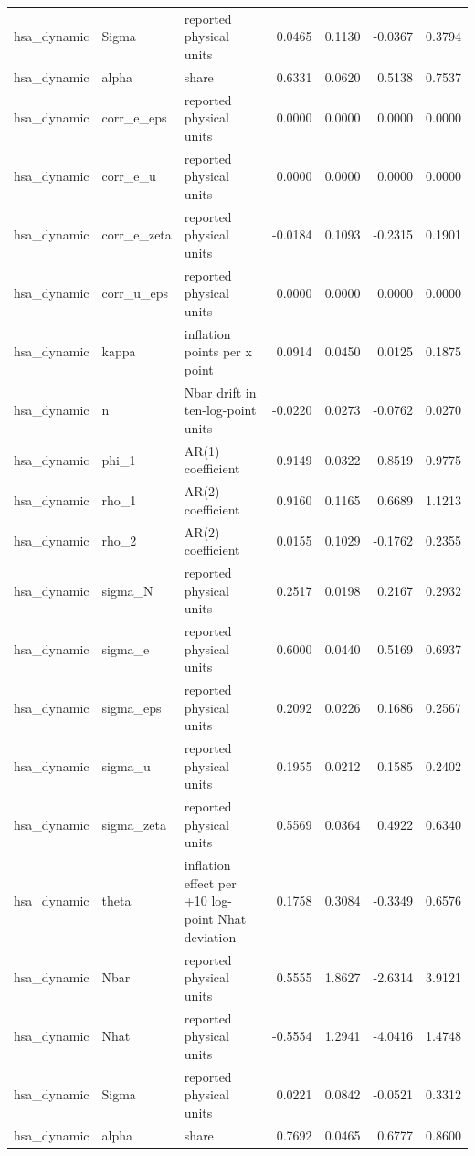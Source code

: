 \begin{tabular}{lllrrrr}
hsa\_dynamic & Sigma & reported physical units & 0.0465 & 0.1130 & -0.0367 & 0.3794 \\
hsa\_dynamic & alpha & share & 0.6331 & 0.0620 & 0.5138 & 0.7537 \\
hsa\_dynamic & corr\_e\_eps & reported physical units & 0.0000 & 0.0000 & 0.0000 & 0.0000 \\
hsa\_dynamic & corr\_e\_u & reported physical units & 0.0000 & 0.0000 & 0.0000 & 0.0000 \\
hsa\_dynamic & corr\_e\_zeta & reported physical units & -0.0184 & 0.1093 & -0.2315 & 0.1901 \\
hsa\_dynamic & corr\_u\_eps & reported physical units & 0.0000 & 0.0000 & 0.0000 & 0.0000 \\
hsa\_dynamic & kappa & inflation points per x point & 0.0914 & 0.0450 & 0.0125 & 0.1875 \\
hsa\_dynamic & n & Nbar drift in ten-log-point units & -0.0220 & 0.0273 & -0.0762 & 0.0270 \\
hsa\_dynamic & phi\_1 & AR(1) coefficient & 0.9149 & 0.0322 & 0.8519 & 0.9775 \\
hsa\_dynamic & rho\_1 & AR(2) coefficient & 0.9160 & 0.1165 & 0.6689 & 1.1213 \\
hsa\_dynamic & rho\_2 & AR(2) coefficient & 0.0155 & 0.1029 & -0.1762 & 0.2355 \\
hsa\_dynamic & sigma\_N & reported physical units & 0.2517 & 0.0198 & 0.2167 & 0.2932 \\
hsa\_dynamic & sigma\_e & reported physical units & 0.6000 & 0.0440 & 0.5169 & 0.6937 \\
hsa\_dynamic & sigma\_eps & reported physical units & 0.2092 & 0.0226 & 0.1686 & 0.2567 \\
hsa\_dynamic & sigma\_u & reported physical units & 0.1955 & 0.0212 & 0.1585 & 0.2402 \\
hsa\_dynamic & sigma\_zeta & reported physical units & 0.5569 & 0.0364 & 0.4922 & 0.6340 \\
hsa\_dynamic & theta & inflation effect per +10 log-point Nhat deviation & 0.1758 & 0.3084 & -0.3349 & 0.6576 \\
hsa\_dynamic & Nbar & reported physical units & 0.5555 & 1.8627 & -2.6314 & 3.9121 \\
hsa\_dynamic & Nhat & reported physical units & -0.5554 & 1.2941 & -4.0416 & 1.4748 \\
hsa\_dynamic & Sigma & reported physical units & 0.0221 & 0.0842 & -0.0521 & 0.3312 \\
hsa\_dynamic & alpha & share & 0.7692 & 0.0465 & 0.6777 & 0.8600 \\

\end{tabular}

